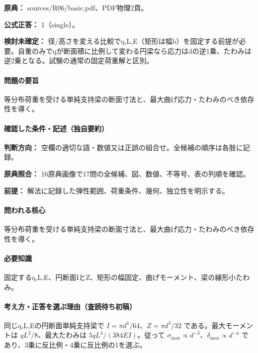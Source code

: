 \noindent\textbf{原典：} sources/R06/basic.pdf、PDF物理2頁。

\textbf{公式正答：} 1（single）。

\par\textbf{検討未確定：} 径/高さを変える比較でq,L,E（矩形は幅b）を固定する前提が必要。自重のみでqが断面積に比例して変わる円梁なら応力はdの逆1乗、たわみは逆2乗となる。試験の通常の固定荷重解と区別。

\paragraph{問題の要旨} 等分布荷重を受ける単純支持梁の断面寸法と、最大曲げ応力・たわみのべき依存性を導く。

\paragraph{確認した条件・記述（独自要約）}\mbox{}\par

\noindent\textbf{判断方向：} 空欄の適切な語・数値又は正誤の組合せ。全候補の順序は各肢に記録。\par

\noindent\textbf{原典照合：} 16原典画像で17問の全候補、図、数値、不等号、表の列順を確認。\par

\noindent\textbf{前提：} 解法に記録した弾性範囲、荷重条件、幾何、独立性を明示する。\par

\paragraph{問われる核心} 等分布荷重を受ける単純支持梁の断面寸法と、最大曲げ応力・たわみのべき依存性を導く。

\paragraph{必要知識} 固定するq,L,E、円断面IとZ、矩形の幅固定、曲げモーメント、梁の線形小たわみ。

\paragraph{考え方・正答を選ぶ理由（査読待ち初稿）} 同じq,L,Eの円断面単純支持梁で \(I=\pi d^4/64\)、\(Z=\pi d^3/32\) である。最大モーメントは \(qL^2/8\)、最大たわみは \(5qL^4/(384EI)\)。従って \(\sigma_{\max}\propto d^{-3}\)、\(\delta_{\max}\propto d^{-4}\) であり、3乗に反比例・4乗に反比例の1を選ぶ。

